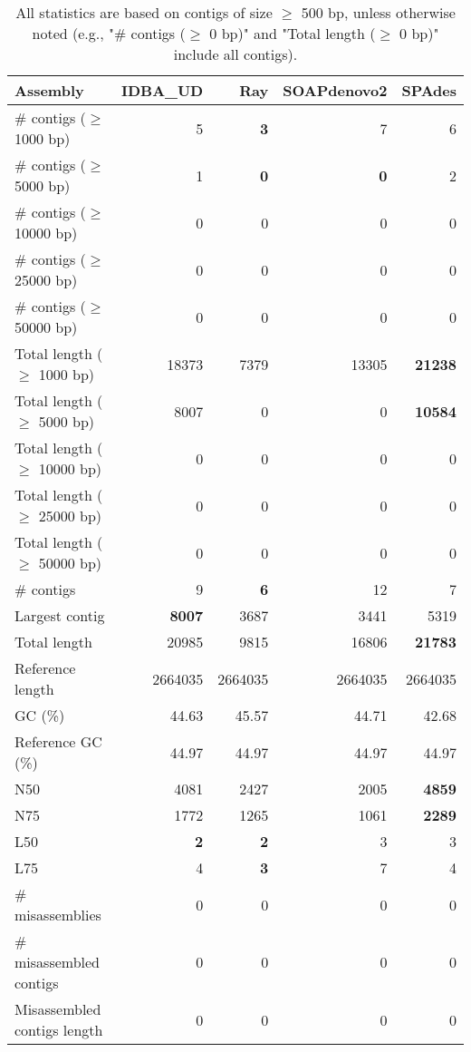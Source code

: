 \documentclass[12pt,a4paper]{article}
\begin{document}
\begin{table}[ht]
\begin{center}
\caption{All statistics are based on contigs of size $\geq$ 500 bp, unless otherwise noted (e.g., "\# contigs ($\geq$ 0 bp)" and "Total length ($\geq$ 0 bp)" include all contigs).}
\begin{tabular}{|l*{4}{|r}|}
\hline
Assembly & IDBA\_UD & Ray & SOAPdenovo2 & SPAdes \\ \hline
\# contigs ($\geq$ 1000 bp) & 5 & {\bf 3} & 7 & 6 \\ \hline
\# contigs ($\geq$ 5000 bp) & 1 & {\bf 0} & {\bf 0} & 2 \\ \hline
\# contigs ($\geq$ 10000 bp) & 0 & 0 & 0 & 0 \\ \hline
\# contigs ($\geq$ 25000 bp) & 0 & 0 & 0 & 0 \\ \hline
\# contigs ($\geq$ 50000 bp) & 0 & 0 & 0 & 0 \\ \hline
Total length ($\geq$ 1000 bp) & 18373 & 7379 & 13305 & {\bf 21238} \\ \hline
Total length ($\geq$ 5000 bp) & 8007 & 0 & 0 & {\bf 10584} \\ \hline
Total length ($\geq$ 10000 bp) & 0 & 0 & 0 & 0 \\ \hline
Total length ($\geq$ 25000 bp) & 0 & 0 & 0 & 0 \\ \hline
Total length ($\geq$ 50000 bp) & 0 & 0 & 0 & 0 \\ \hline
\# contigs & 9 & {\bf 6} & 12 & 7 \\ \hline
Largest contig & {\bf 8007} & 3687 & 3441 & 5319 \\ \hline
Total length & 20985 & 9815 & 16806 & {\bf 21783} \\ \hline
Reference length & 2664035 & 2664035 & 2664035 & 2664035 \\ \hline
GC (\%) & 44.63 & 45.57 & 44.71 & 42.68 \\ \hline
Reference GC (\%) & 44.97 & 44.97 & 44.97 & 44.97 \\ \hline
N50 & 4081 & 2427 & 2005 & {\bf 4859} \\ \hline
N75 & 1772 & 1265 & 1061 & {\bf 2289} \\ \hline
L50 & {\bf 2} & {\bf 2} & 3 & 3 \\ \hline
L75 & 4 & {\bf 3} & 7 & 4 \\ \hline
\# misassemblies & 0 & 0 & 0 & 0 \\ \hline
\# misassembled contigs & 0 & 0 & 0 & 0 \\ \hline
Misassembled contigs length & 0 & 0 & 0 & 0 \\ \hline

\end{tabular}
\end{center}
\end{table}
\end{document}

